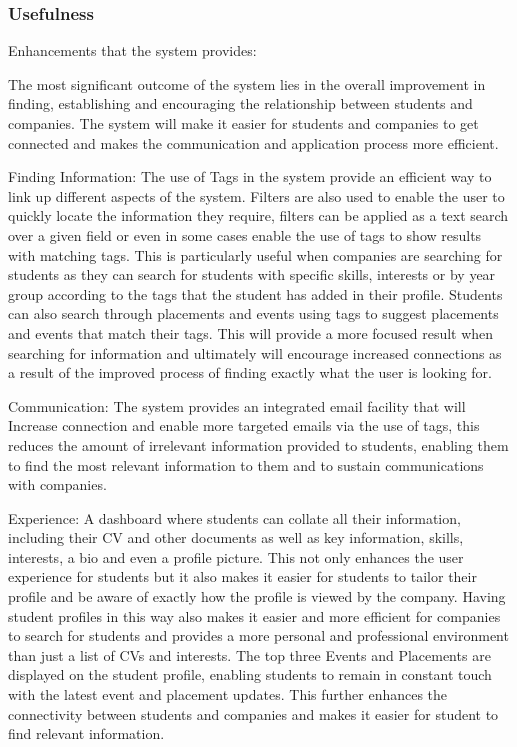	\subsubsection{Usefulness}
Enhancements that the system provides:

The most significant outcome of the system lies in the overall improvement in finding, establishing and encouraging the relationship between students and companies. The system will make it easier for students and companies to get connected and makes the communication and application process more efficient.

Finding Information: 
The use of Tags in the system provide an efficient way to link up different aspects of the system. Filters are also used to enable the user to quickly locate the information they require, filters can be applied as a text search over a given field or even in some cases enable the use of tags to show results with matching tags. This is particularly useful when companies are searching for students as they can search for students with specific skills, interests or by year group according to the tags that the student has added in their profile. Students can also search through placements and events using tags to suggest placements and events that match their tags. This will provide a more focused result when searching for information and ultimately will encourage increased connections as a result of the improved process of finding exactly what the user is looking for.

Communication: 
The system provides an integrated email facility that will Increase connection and enable more targeted emails via the use of tags, this reduces the amount of irrelevant information provided to students, enabling them to find the most relevant information to them and to sustain communications with companies.

Experience: 
A dashboard where students can collate all their information, including their CV and other documents as well as key information, skills, interests, a bio and even a profile picture. This not only enhances the user experience for students but it also makes it easier for students to tailor their profile and be aware of exactly how the profile is viewed by the company. Having student profiles in this way also makes it easier and more efficient for companies to search for students and provides a more personal and professional environment than just a list of CVs and interests. The top three Events and Placements are displayed on the student profile, enabling students to remain in constant touch with the latest event and placement updates. This further enhances the connectivity between students and companies and makes it easier for student to find relevant information.

